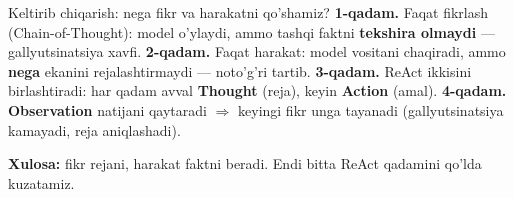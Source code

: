 \documentclass[aspectratio=169,11pt]{beamer}
\begin{document}
\begin{frame}{Keltirib chiqarish: nega fikr va harakatni qo'shamiz?}
  \textbf{1-qadam.} Faqat fikrlash (Chain-of-Thought): model o'ylaydi, ammo
  tashqi faktni \textbf{tekshira olmaydi} --- gallyutsinatsiya xavfi.
  \pause
  \textbf{2-qadam.} Faqat harakat: model vositani chaqiradi, ammo \textbf{nega}
  ekanini rejalashtirmaydi --- noto'g'ri tartib.
  \pause
  \textbf{3-qadam.} ReAct ikkisini birlashtiradi: har qadam avval \textbf{Thought}
  (reja), keyin \textbf{Action} (amal).
  \pause
  \textbf{4-qadam.} \textbf{Observation} natijani qaytaradi $\Rightarrow$ keyingi
  fikr unga tayanadi (gallyutsinatsiya kamayadi, reja aniqlashadi).
  \begin{tcolorbox}[okbox,top=2pt,bottom=2pt]
    \small \textbf{Xulosa:} fikr rejani, harakat faktni beradi. Endi bitta
    ReAct qadamini qo'lda kuzatamiz.
  \end{tcolorbox}
\end{frame}
\end{document}
